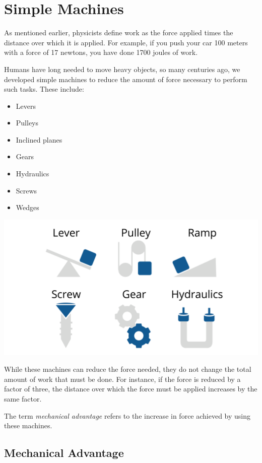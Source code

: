 \chapter{Simple Machines}

As mentioned earlier, physicists define work as the force applied times the 
distance over which it is applied. For example, if you push your car 100 meters 
with a force of 17 newtons, you have done 1700 joules of work.

Humans have long needed to move heavy objects, so many centuries ago, we 
developed simple machines to reduce the amount of force necessary to perform 
such tasks. These include:

\begin{itemize}
    \item Levers
    \item Pulleys
    \item Inclined planes
    \item Gears
    \item Hydraulics
    \item Screws
    \item Wedges
\end{itemize}

\includegraphics[width=\textwidth]{simplemachines.png}

While these machines can reduce the force needed, they do not change the total 
amount of work that must be done. For instance, if the force is reduced by a 
factor of three, the distance over which the force must be applied increases by 
the same factor.

The term \textit{mechanical advantage} refers to the increase in force achieved 
by using these machines.

\section{Mechanical Advantage}

